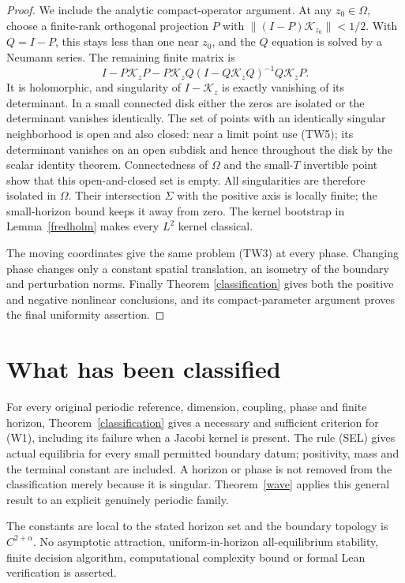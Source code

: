\documentclass[11pt,a4paper]{article}
\begin{document}
\begin{proof}
We include the analytic compact-operator argument. At any
$z_0\in\Omega$, choose a finite-rank orthogonal projection $P$
with $\|(I-P)\mathcal K_{z_0}\|<1/2$. With $Q=I-P$, this stays
less than one near $z_0$, and the $Q$ equation is solved by a
Neumann series. The remaining finite matrix is
\begin{equation}\tag{TW5}\label{TW5}
 I-P\mathcal K_zP-P\mathcal K_zQ
       (I-Q\mathcal K_zQ)^{-1}Q\mathcal K_zP.
\end{equation}
It is holomorphic, and singularity of $I-\mathcal K_z$ is exactly
vanishing of its determinant. In a small connected disk either the
zeros are isolated or the determinant vanishes identically.
The set of points with an identically singular neighborhood is open
and also closed: near a limit point use (TW5); its determinant
vanishes on an open subdisk and hence throughout the disk by the
scalar identity theorem. Connectedness of $\Omega$ and the small-$T$
invertible point show that this open-and-closed set is empty.
All singularities are therefore isolated in $\Omega$.
Their intersection $\Sigma$ with the positive axis is locally finite;
the small-horizon bound keeps it away from zero. The kernel bootstrap
in Lemma~\ref{fredholm} makes every $L^2$ kernel classical.

The moving coordinates give the same problem (TW3) at every phase.
Changing phase changes only a constant spatial translation, an
isometry of the boundary and perturbation norms. Finally Theorem
\ref{classification} gives both the positive and negative nonlinear
conclusions, and its compact-parameter argument proves the final
uniformity assertion.
\end{proof}

\section{What has been classified}
For every original periodic reference, dimension, coupling, phase and
finite horizon, Theorem~\ref{classification} gives a necessary and
sufficient criterion for (W1), including its failure when a Jacobi
kernel is present. The rule (SEL) gives actual equilibria for every
small permitted boundary datum; positivity, mass and the terminal
constant are included. A horizon or phase is not removed from the
classification merely because it is singular. Theorem~\ref{wave}
applies this general result to an explicit genuinely periodic family.

The constants are local to the stated horizon set and the boundary
topology is $C^{2+\alpha}$. No asymptotic attraction, uniform-in-horizon
all-equilibrium stability, finite decision algorithm, computational
complexity bound or formal Lean verification is asserted.
\end{document}
